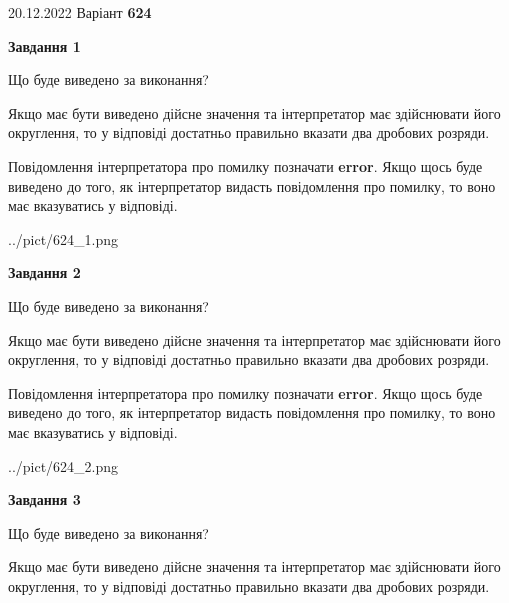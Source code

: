 \documentclass[12pt, ukrainian]{article}
\begin{document}
{20.12.2022 Варіант \No \textbf { 624 }\par}
{
\begin {Large}

{\begin {center}\textbf{Завдання 1}\end {center}}\par
Що буде виведено за виконання? \par

Якщо має бути виведено дійсне значення та інтерпретатор має здійснювати його округлення, 
то у відповіді достатньо правильно вказати два дробових розряди.

Повідомлення інтерпретатора про помилку позначати \textbf{error}.
Якщо щось буде виведено до того, як інтерпретатор видасть повідомлення про помилку, 
то воно має вказуватись у відповіді. \par

\begin{center}
	{../pict/624_1.png}
\end{center}
\newpage

{\begin {center}\textbf{Завдання 2}\end {center}}\par
Що буде виведено за виконання? \par

Якщо має бути виведено дійсне значення та інтерпретатор має здійснювати його округлення, 
то у відповіді достатньо правильно вказати два дробових розряди.

Повідомлення інтерпретатора про помилку позначати \textbf{error}.
Якщо щось буде виведено до того, як інтерпретатор видасть повідомлення про помилку, 
то воно має вказуватись у відповіді. \par

\begin{center}
	{../pict/624_2.png}
\end{center}
\newpage

{\begin {center}\textbf{Завдання 3}\end {center}}\par
Що буде виведено за виконання? \par

Якщо має бути виведено дійсне значення та інтерпретатор має здійснювати його округлення, 
то у відповіді достатньо правильно вказати два дробових розряди.


\end{Large}}
\end{document}
